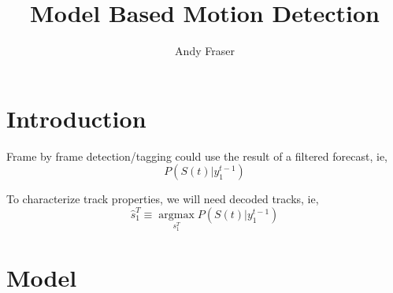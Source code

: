\documentclass[12pt]{article}
\title{Model Based Motion Detection}
\author{Andy Fraser}
\newcommand{\argmax}{\operatorname*{argmax}}
\begin{document}
\maketitle

\section{Introduction}
\label{sec:introduction}

Frame by frame detection/tagging could use the result of a filtered
forecast, ie,
\begin{equation*}
  P(S(t)|y_1^{t-1})
\end{equation*}

To characterize track properties, we will need decoded tracks, ie,
\begin{equation*}
  \hat s_1^T \equiv \argmax_{s_1^T} P(S(t)|y_1^{t-1})
\end{equation*}

\section{Model}
\label{sec:model}
\end{document}
